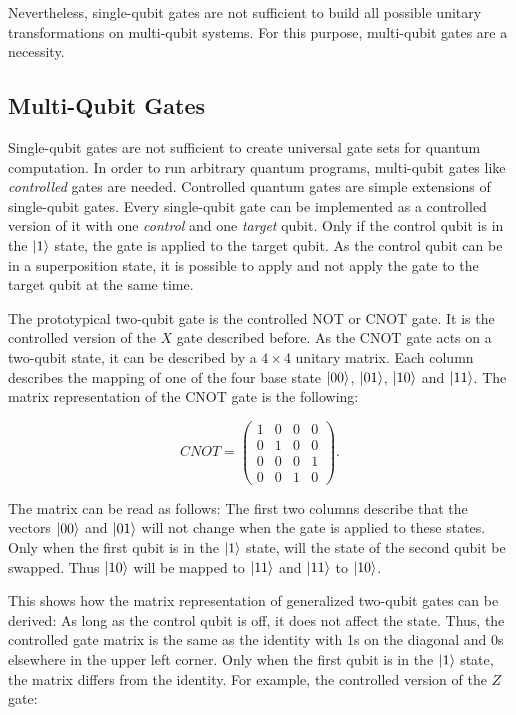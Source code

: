 Nevertheless, single-qubit gates are not sufficient to build all possible unitary transformations on multi-qubit systems. 
For this purpose, multi-qubit gates are a necessity.

\subsection{Multi-Qubit Gates}

Single-qubit gates are not sufficient to create universal gate sets for quantum
computation. In order to run arbitrary quantum programs, multi-qubit gates like
 \textit{controlled} gates are needed.
Controlled quantum gates are simple extensions of single-qubit gates. Every single-qubit gate can be implemented as a controlled 
version of it with one \textit{control} and one \textit{target} qubit. Only if
the control qubit is in the $\Ket{1}$ state, the gate is applied to the target
qubit. As the control qubit can be in a superposition state, it is possible to apply and not apply the gate to the target qubit at the same time.

The prototypical two-qubit gate is the controlled NOT or CNOT gate. It is the controlled version of the 
$X$ gate described before. As the CNOT gate acts on a two-qubit state, it can be described by 
a $4 \times 4$ unitary matrix. Each column describes the mapping of one of the four base
state $\Ket{00}$, $\Ket{01}$, $\Ket{10}$ and $\Ket{11}$. 
The matrix representation of the CNOT gate is the following:

\begin{equation}
  CNOT = \begin{pmatrix}
    1 & 0 & 0 & 0 \\
    0 & 1 & 0 & 0 \\
    0 & 0 & 0 & 1 \\
    0 & 0 & 1 & 0
    \end{pmatrix}.
\end{equation}

The matrix can be read as follows: The first two columns describe that the vectors $\Ket{00}$ and $\Ket{01}$ will not change when the gate is applied to these states. Only when the first qubit is in the $\Ket{1}$ state, will the state of the second qubit be swapped. Thus $\Ket{10}$ will be mapped to $\Ket{11}$ and $\Ket{11}$ to $\Ket{10}$. 

This shows how the matrix representation of generalized two-qubit gates can be derived: As long as the control qubit is off, it does not affect the state. Thus, the controlled gate matrix is the same as the identity with 1s on the diagonal and 0s elsewhere in the upper left corner. Only when the first qubit is in the $\Ket{1}$ state, the matrix differs from the identity. For example, the 
controlled version of the $Z$ gate:

